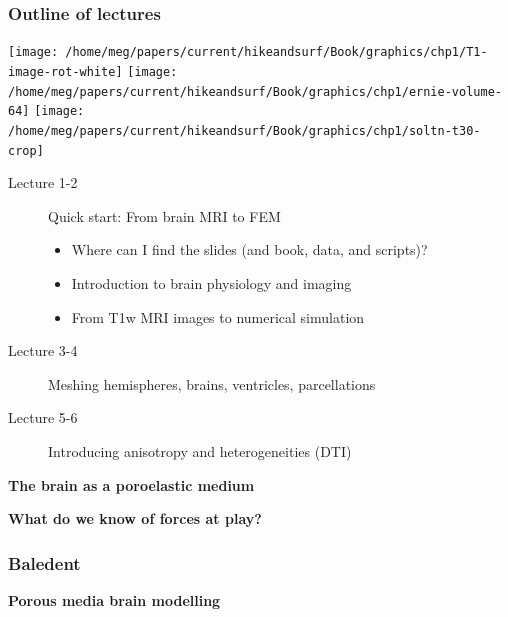 \documentclass[mathserif, aspectratio=169]{beamer}
\newcommand{\mysection}[1]{\begin{frame} \begin{center} \vspace{3em} \textbf{#1} \end{center} \end{frame}}
\begin{document}
\begin{frame}
  \frametitle{Outline of lectures}
  \begin{center}
  \texttt{[image: /home/meg/papers/current/hikeandsurf/Book/graphics/chp1/T1-image-rot-white]}
  \texttt{[image: /home/meg/papers/current/hikeandsurf/Book/graphics/chp1/ernie-volume-64]}
  \texttt{[image: /home/meg/papers/current/hikeandsurf/Book/graphics/chp1/soltn-t30-crop]}
  \end{center}
  \begin{description}
    \item[Lecture 1-2] Quick start: From brain MRI to FEM
      \begin{itemize}
      \item
        Where can I find the slides (and book, data, and scripts)?
      \item
        Introduction to brain physiology and imaging
      \item
        From T1w MRI images to numerical simulation
      \end{itemize}
    \item[Lecture 3-4] Meshing hemispheres, brains, ventricles, parcellations
    \item[Lecture 5-6] Introducing anisotropy and heterogeneities (DTI)
  \end{description}
\end{frame}

\mysection{The brain as a poroelastic medium}





\mysection{What do we know of forces at play?}



\begin{frame}
\frametitle{Baledent}


\end{frame}

\mysection{Porous media brain modelling}
\end{document}
